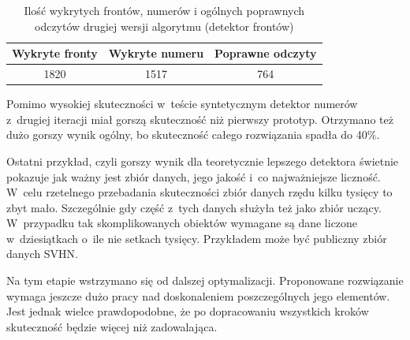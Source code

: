 \begin{table}[!h]
	\centering
	\begin{tabular}{c|c|c}
		Wykryte fronty  & Wykryte numeru & Poprawne odczyty \\ \hline
		1820 & 1517 & 764 
	\end{tabular}
	\caption{Ilość wykrytych frontów, numerów i ogólnych poprawnych 
		odczytów drugiej wersji algorytmu (detektor frontów)}
	\label{tab:upset_second_version_number_detector}
\end{table}

Pomimo wysokiej skuteczności w~teście syntetycznym
detektor numerów z~drugiej iteracji miał gorszą skuteczność
niż pierwszy prototyp. Otrzymano też dużo gorszy wynik
ogólny, bo skuteczność całego rozwiązania spadła do
40\%.

Ostatni przykład, czyli gorszy wynik dla teoretycznie 
lepszego detektora świetnie pokazuje jak ważny jest zbiór
danych, jego jakość i~co najważniejsze liczność. 
W~celu rzetelnego przebadania skuteczności zbiór danych 
rzędu kilku tysięcy to zbyt mało. Szczególnie gdy część 
z~tych danych służyła też jako zbiór uczący.
W~przypadku tak skomplikowanych obiektów wymagane są 
dane liczone w~dziesiątkach o~ile nie setkach tysięcy.
Przykładem może być publiczny zbiór danych SVHN.

Na tym etapie wstrzymano się od dalszej optymalizacji. 
Proponowane rozwiązanie wymaga jeszcze dużo pracy nad 
doskonaleniem poszczególnych jego elementów.
Jest jednak wielce prawdopodobne, że po dopracowaniu 
wszystkich kroków skuteczność będzie więcej niż zadowalająca.
